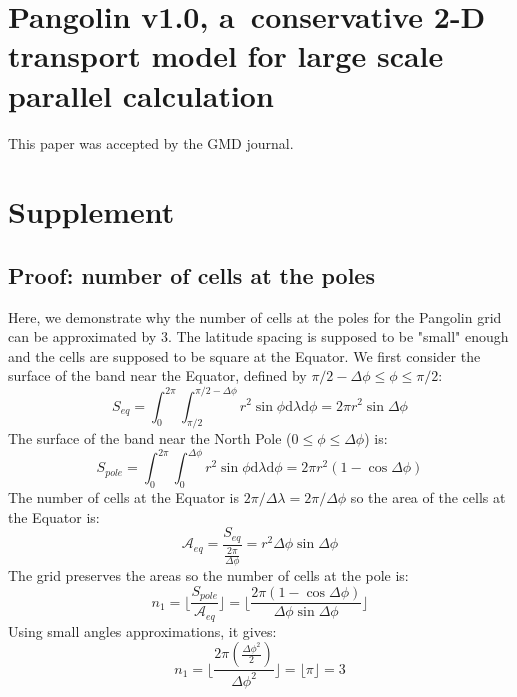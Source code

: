 \appendix

\chapter{Pangolin v1.0, a~conservative 2-D transport model for large scale
parallel calculation}
\label{app:paper}
This paper was accepted by the \gls{GMD} journal.



\chapter{Supplement}
\section{Proof: number of cells at the poles}
\label{sec:pole_area}
\def\dphi{\Delta\phi}
\def\dlamb{\Delta\lambda}
Here, we demonstrate why the number of cells at the poles for the Pangolin grid
can be approximated by $3$. The latitude spacing is supposed to be "small"
enough and the cells are supposed to be square at the Equator.
We first consider the surface of the band near the Equator, defined by 
$\pi/2 - \dphi \le \phi \le \pi/2$:
\begin{equation*}
  S_{eq} = \int_{0}^{2\pi}\int_{\pi/2}^{\pi/2 - \dphi} r^2 \sin\phi \mathrm{d}\lambda
  \mathrm{d}\phi 
      = 2\pi r^2 \sin \dphi
\end{equation*}
The surface of the band near the North Pole ($0 \le \phi \le \dphi$) is:
\begin{equation*}
  S_{pole} = \int_{0}^{2\pi}\int_{0}^{\dphi} r^2 \sin\phi \mathrm{d}\lambda
  \mathrm{d}\phi 
      = 2\pi r^2 (1-\cos \dphi)
\end{equation*}
The number of cells at the Equator is $2\pi/\dlamb=2\pi/\dphi$ so the area of the cells at
the Equator is:
\begin{equation*}
  \mathcal{A}_{eq}=\frac{S_{eq}}{\frac{2\pi}{\dphi}} = r^2 \dphi \sin \dphi
\end{equation*}
The grid preserves the areas so the number of cells at the pole is:
\begin{equation*}
  n_1 = \Big \lfloor\frac{S_{pole}}{\mathcal{A}_{eq}} \Big \rfloor 
      =\Big \lfloor\frac{2\pi(1-\cos \dphi)}{\dphi \sin
  \dphi } \Big \rfloor 
\end{equation*}
Using small angles approximations, it gives:
\begin{equation*}
  n_1 = \Big \lfloor \frac{2\pi(\frac{\dphi^2}{2})}{\dphi^2} \Big \rfloor = \lfloor \pi
  \rfloor = 3
\end{equation*}

